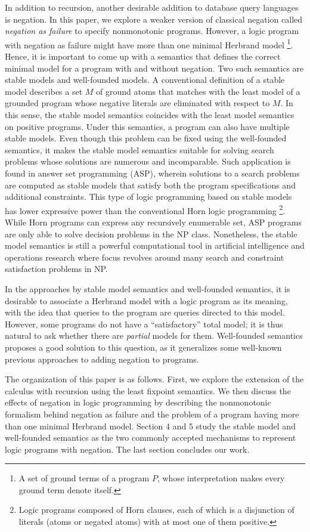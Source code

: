 In addition to recursion, another desirable addition to database query languages 
is negation. In this paper, we explore a weaker version of classical negation called 
\emph{negation as failure} to specify nonmonotonic programs. However, a logic 
program with negation as failure might have more than one minimal Herbrand model 
\footnote{A set of ground terms of a program $P$, whose interpretation 
makes every ground term denote itself.}. Hence, it is important 
to come up with a semantics that defines the correct minimal 
model for a program with and without negation. Two such semantics 
are stable models and well-founded models. A conventional 
definition of a stable model
describes a set $M$ of ground atoms that matches with the least model 
of a grounded program whose negative literals are eliminated with respect to 
$M$. In this sense, the stable model semantics coincides with 
the least model semantics on positive programs. Under this 
semantics, a program can also have multiple stable models. Even though 
this problem can be fixed using the well-founded semantics, 
it makes the stable model semantics suitable for solving search 
problems whose solutions are numerous and incomparable. Such 
application is found in answer set programming (ASP), wherein 
solutions to a search problems are computed as stable models 
that satisfy both the program specifications and additional constraints. 
This type of logic programming based on stable models has lower 
expressive power than the conventional Horn logic programming 
\footnote{Logic programs composed of Horn clauses, 
each of which is a disjunction of literals (atoms or negated atoms) with at most one of 
them positive.}. While Horn programs can express any recursively enumerable set, 
ASP programs are only able to solve decision problems in the NP class. 
Nonetheless, the stable model semantics is still 
a powerful computational tool in artificial 
intelligence and operations research where focus 
revolves around many search and constraint satisfaction 
problems in NP.

In the approaches by stable model semantics and well-founded semantics, it is desirable to associate a Herbrand model with a logic program as its meaning, with the idea that queries to the program are queries directed to this model. However, some programs do not have a ``satisfactory'' total model; it is thus natural to ask whether there are \emph{partial} models for them. Well-founded semantics proposes a good solution to this question, as it generalizes some well-known previous approaches to adding negation to programs.

The organization of this paper is as follows. First, we 
explore the extension of the calculus with recursion 
using the least fixpoint semantics. We then discuss the effects 
of negation in logic programming by describing the nonmonotonic 
formalism behind negation as failure and the problem of 
a program having more than one minimal Herbrand model. Section 4 and 5 
study the stable model and well-founded semantics as the two 
commonly accepted mechanisms to represent logic programs with 
negation. The last section concludes our work.
